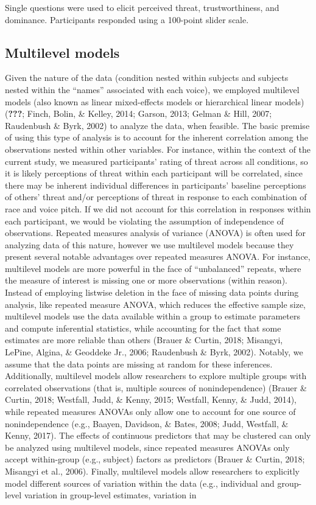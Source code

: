 \documentclass[
  english,
  man]{apa6}
\begin{document}
Single questions were used to elicit perceived threat, trustworthiness, and dominance. Participants responded using a 100-point slider scale.

\hypertarget{multilevel-models}{%
\subsection{Multilevel models}\label{multilevel-models}}

Given the nature of the data (condition nested within subjects and subjects nested within the \enquote{names} associated with each voice), we employed multilevel models (also known as linear mixed-effects models or hierarchical linear models) ({\textbf{???}}; Finch, Bolin, \& Kelley, 2014; Garson, 2013; Gelman \& Hill, 2007; Raudenbush \& Byrk, 2002) to analyze the data, when feasible. The basic premise of using this type of analysis is to account for the inherent correlation among the observations nested within other variables. For instance, within the context of the current study, we measured participants' rating of threat across all conditions, so it is likely perceptions of threat within each participant will be correlated, since there may be inherent individual differences in participants' baseline perceptions of others' threat and/or perceptions of threat in response to each combination of race and voice pitch. If we did not account for this correlation in responses within each participant, we would be violating the assumption of independence of observations. Repeated measures analysis of variance (ANOVA) is often used for analyzing data of this nature, however we use multilevel models because they present several notable advantages over repeated measures ANOVA. For instance, multilevel models are more powerful in the face of \enquote{unbalanced} repeats, where the measure of interest is missing one or more observations (within reason). Instead of employing listwise deletion in the face of missing data points during analysis, like repeated measure ANOVA, which reduces the effective sample size, multilevel models use the data available within a group to estimate parameters and compute inferential statistics, while accounting for the fact that some estimates are more reliable than others (Brauer \& Curtin, 2018; Misangyi, LePine, Algina, \& Geoddeke Jr., 2006; Raudenbush \& Byrk, 2002). Notably, we assume that the data points are missing at random for these inferences. Additionally, multilevel models allow researchers to explore multiple groups with correlated observations (that is, multiple sources of nonindependence) (Brauer \& Curtin, 2018; Westfall, Judd, \& Kenny, 2015; Westfall, Kenny, \& Judd, 2014), while repeated measures ANOVAs only allow one to account for one source of nonindependence (e.g., Baayen, Davidson, \& Bates, 2008; Judd, Westfall, \& Kenny, 2017). The effects of continuous predictors that may be clustered can only be analyzed using multilevel models, since repeated measures ANOVAs only accept within-group (e.g., subject) factors as predictors (Brauer \& Curtin, 2018; Misangyi et al., 2006). Finally, multilevel models allow researchers to explicitly model different sources of variation within the data (e.g., individual and group-level variation in group-level estimates, variation in 
\end{document}
